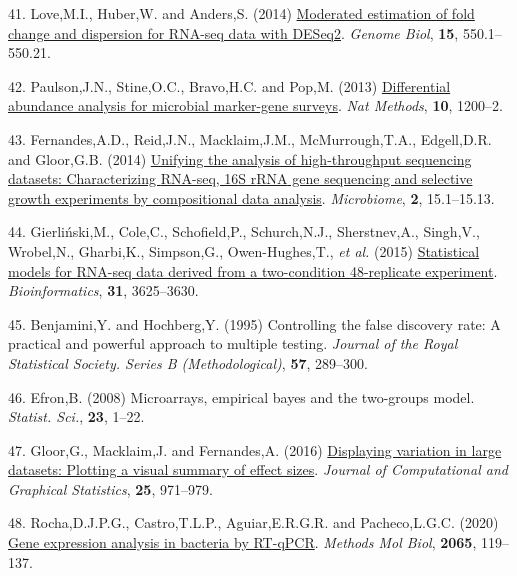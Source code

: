 \documentclass[
]{article}
\newlength{\cslhangindent}
\newenvironment{CSLReferences}[2] %
 {\begin{list}{}{%
  \setlength{\itemindent}{0pt}
  \setlength{\leftmargin}{0pt}
  \setlength{\parsep}{0pt}
  \ifodd #1
   \setlength{\leftmargin}{\cslhangindent}
   \setlength{\itemindent}{-1\cslhangindent}
  \fi
  \setlength{\itemsep}{#2\baselineskip}}}
 {\end{list}}
\begin{document}
\begin{CSLReferences}{1}{1}
41. Love,M.I., Huber,W. and Anders,S. (2014)
\href{https://doi.org/10.1186/s13059-014-0550-8}{Moderated estimation of
fold change and dispersion for RNA-seq data with DESeq2}. \emph{Genome
Biol}, \textbf{15}, 550.1--550.21.

42. Paulson,J.N., Stine,O.C., Bravo,H.C. and Pop,M. (2013)
\href{https://doi.org/10.1038/nmeth.2658}{Differential abundance
analysis for microbial marker-gene surveys}. \emph{Nat Methods},
\textbf{10}, 1200--2.

43. Fernandes,A.D., Reid,J.N., Macklaim,J.M., McMurrough,T.A.,
Edgell,D.R. and Gloor,G.B. (2014)
\href{https://doi.org/10.1186/2049-2618-2-15}{Unifying the analysis of
high-throughput sequencing datasets: Characterizing {RNA}-seq, 16{S}
r{RNA} gene sequencing and selective growth experiments by compositional
data analysis}. \emph{Microbiome}, \textbf{2}, 15.1--15.13.

44. Gierliński,M., Cole,C., Schofield,P., Schurch,N.J., Sherstnev,A.,
Singh,V., Wrobel,N., Gharbi,K., Simpson,G., Owen-Hughes,T., \emph{et
al.} (2015)
\href{https://doi.org/10.1093/bioinformatics/btv425}{Statistical models
for RNA-seq data derived from a two-condition 48-replicate experiment}.
\emph{Bioinformatics}, \textbf{31}, 3625--3630.

45. Benjamini,Y. and Hochberg,Y. (1995) Controlling the false discovery
rate: A practical and powerful approach to multiple testing.
\emph{Journal of the Royal Statistical Society. Series B
(Methodological)}, \textbf{57}, 289--300.

46. Efron,B. (2008) Microarrays, empirical bayes and the two-groups
model. \emph{Statist. Sci.}, \textbf{23}, 1--22.

47. Gloor,G., Macklaim,J. and Fernandes,A. (2016)
\href{https://doi.org/10.1080/10618600.2015.1131161}{Displaying
variation in large datasets: Plotting a visual summary of effect sizes}.
\emph{Journal of Computational and Graphical Statistics}, \textbf{25},
971--979.

48. Rocha,D.J.P.G., Castro,T.L.P., Aguiar,E.R.G.R. and Pacheco,L.G.C.
(2020) \href{https://doi.org/10.1007/978-1-4939-9833-3_10}{Gene
expression analysis in bacteria by RT-qPCR}. \emph{Methods Mol Biol},
\textbf{2065}, 119--137.


\end{CSLReferences}
\end{document}
